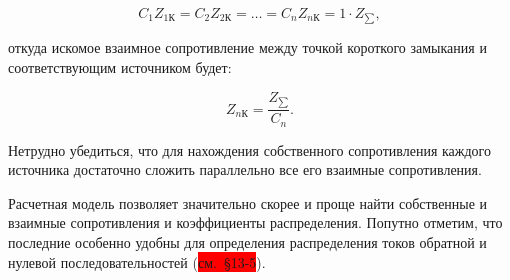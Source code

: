 \begin{equation*}
	C_1 Z_{1\text{К}} = C_2 Z_{2\text{К}} = \ldots = C_n Z_{n\text{К}} = 1 \cdot Z_{\sum},
\end{equation*}	

откуда искомое взаимное сопротивление между точкой короткого замыкания и соответствующим источником будет:

\begin{equation}
	Z_{n\text{К}} = \frac{Z_{\sum}}{C_n}.
	\label{eq:2-37 Z_nK}
\end{equation}	

Нетрудно убедиться, что для нахождения собственного сопротивления каждого источника достаточно сложить параллельно все его взаимные сопротивления.

Расчетная модель позволяет значительно скорее и проще найти собственные и взаимные сопротивления и коэффициенты распределения. Попутно отметим, что последние особенно удобны для определения распределения токов обратной и нулевой последовательностей (\colorbox{red}{см.~§13-5}).

\addtocounter{example}{1}

